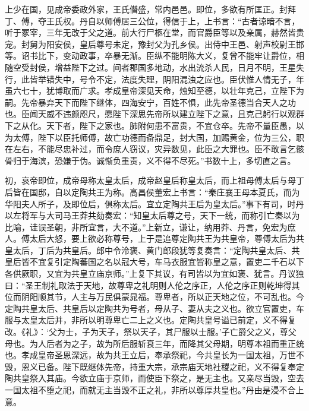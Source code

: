 \documentclass[12pt,UTF8]{ctexbook}
\begin{document}
上少在国，见成帝委政外家，王氏僭盛，常内邑邑。即位，多欲有所匡正。封拜丁、傅，夺王氏权。丹自以师傅居三公位，得信于上，上书言：“古者谅暗不言，听于冢宰，三年无改于父之道。前大行尸柩在堂，而官爵臣等以及亲属，赫然皆贵宠。封舅为阳安侯，皇后尊号未定，豫封父为孔乡侯。出侍中王邑、射声校尉王邯等。诏书比下，变动政事，卒暴无渐。臣纵不能明陈大义，复曾不能牢让爵位，相随空受封侯，增益陛下之过。间者郡国多地动，水出流杀人民，日月不明，王星失行，此皆举错失中，号令不定，法度失理，阴阳混浊之应也。臣伏惟人情无子，年虽六七十，犹博取而广求。孝成皇帝深见天命，烛知至德，以壮年克己，立陛下为嗣。先帝暴弃天下而陛下继体，四海安宁，百姓不惧，此先帝圣德当合天人之功也。臣闻天威不违颜咫尺，愿陛下深思先帝所以建立陛下之意，且克己躬行以观群下之从化。天下者，陛下之家也。肺附何患不富贵，不宜仓卒。先帝不量臣愚，以为太傅，陛下以臣托师傅，故亡功德而备鼎足，封大国，加赐黄金，位为三公，职在左右，不能尽忠补过，而令庶人窃议，灾异数见，此臣之大罪也。臣不敢言乞骸骨归于海滨，恐嫌于伪。诚惭负重责，义不得不尽死。”书数十上，多切直之言。



初，哀帝即位，成帝母称太皇太后，成帝赵皇后称皇太后，而上祖母傅太后与母丁后皆在国邸，自以定陶共王为称。高昌侯董宏上书言：“秦庄襄王母本夏氏，而为华阳夫人所子，及即位后，俱称太后。宜立定陶共王后为皇太后。”事下有司，时丹以左将军与大司马王莽共劾奏宏：“知皇太后尊之号，天下一统，而称引亡秦以为比喻，诖误圣朝，非所宜言，大不道。”上新立，谦让，纳用莽、丹言，免宏为庶人。傅太后大怒，要上欲必称尊号，上于是追尊定陶共王为共皇帝，尊傅太后为共皇太后，丁后为共皇后。郎中令泠褒、黄门郎段犹等复奏言：“定陶共皇太后、共皇后皆不宜复引定陶蕃国之名以冠大号，车马衣服宜皆称皇之意，置吏二千石以下各供厥职，又宜为共皇立庙京师。”上复下其议，有司皆以为宜如褒、犹言。丹议独曰：“圣王制礼取法于天地，故尊卑之礼明则人伦之序正，人伦之序正则乾坤得其位而阴阳顺其节，人主与万民俱蒙晁福。尊卑者，所以正天地之位，不可乱也。今定陶共皇太后、共皇后以定陶共为号者，母从子、妻从夫之义也。欲立官置吏，车服与太皇太后并，非所以明尊卑亡二上之义也。定陶共皇号谥已前定，义不得复改。《礼》：‘父为士，子为天子，祭以天子，其尸服以士服。’子亡爵父之义，尊父母也。为人后者为之子，故为所后服斩衰三年，而降其父母期，明尊本祖而重正统也。孝成皇帝圣恩深远，故为共王立后，奉承祭祀，今共皇长为一国太祖，万世不毁，恩义已备。陛下既继体先帝，持重大宗，承宗庙天地社稷之祀，义不得复奉定陶共皇祭入其庙。今欲立庙于京师，而使臣下祭之，是无主也。又亲尽当毁，空去一国太祖不堕之祀，而就无主当毁不正之礼，非所以尊厚共皇也。”丹由是浸不合上意。
\end{document}
